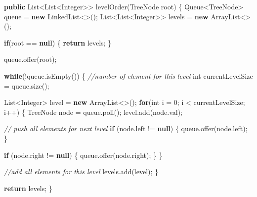 \documentclass[]{book}
\newenvironment{Shaded}{\begin{snugshade}}{\end{snugshade}}
\newcommand{\BuiltInTok}[1]{#1}
\newcommand{\CommentTok}[1]{\textcolor[rgb]{0.56,0.35,0.01}{\textit{#1}}}
\newcommand{\DataTypeTok}[1]{\textcolor[rgb]{0.13,0.29,0.53}{#1}}
\newcommand{\DecValTok}[1]{\textcolor[rgb]{0.00,0.00,0.81}{#1}}
\newcommand{\FunctionTok}[1]{\textcolor[rgb]{0.00,0.00,0.00}{#1}}
\newcommand{\KeywordTok}[1]{\textcolor[rgb]{0.13,0.29,0.53}{\textbf{#1}}}
\newcommand{\NormalTok}[1]{#1}
\begin{document}
\begin{Shaded}
\begin{Highlighting}[]
\KeywordTok{public} \BuiltInTok{List}\NormalTok{<}\BuiltInTok{List}\NormalTok{<}\BuiltInTok{Integer}\NormalTok{>> }\FunctionTok{levelOrder}\NormalTok{(}\BuiltInTok{TreeNode}\NormalTok{ root) \{}
    \BuiltInTok{Queue}\NormalTok{<}\BuiltInTok{TreeNode}\NormalTok{> queue = }\KeywordTok{new} \BuiltInTok{LinkedList}\NormalTok{<>();}
    \BuiltInTok{List}\NormalTok{<}\BuiltInTok{List}\NormalTok{<}\BuiltInTok{Integer}\NormalTok{>> levels = }\KeywordTok{new} \BuiltInTok{ArrayList}\NormalTok{<>();}

    \KeywordTok{if}\NormalTok{(root == }\KeywordTok{null}\NormalTok{) \{}
        \KeywordTok{return}\NormalTok{ levels;}
\NormalTok{    \}}

\NormalTok{    queue.}\FunctionTok{offer}\NormalTok{(root);}

    \KeywordTok{while}\NormalTok{(!queue.}\FunctionTok{isEmpty}\NormalTok{()) \{}
        \CommentTok{//number of element for this level}
        \DataTypeTok{int}\NormalTok{ currentLevelSize = queue.}\FunctionTok{size}\NormalTok{();}

        \BuiltInTok{List}\NormalTok{<}\BuiltInTok{Integer}\NormalTok{> level = }\KeywordTok{new} \BuiltInTok{ArrayList}\NormalTok{<>();}
        \KeywordTok{for}\NormalTok{(}\DataTypeTok{int}\NormalTok{ i = }\DecValTok{0}\NormalTok{; i < currentLevelSize; i++) \{}
            \BuiltInTok{TreeNode}\NormalTok{ node = queue.}\FunctionTok{poll}\NormalTok{();}
\NormalTok{            level.}\FunctionTok{add}\NormalTok{(node.}\FunctionTok{val}\NormalTok{);}

            \CommentTok{// push all elements for next level}
            \KeywordTok{if}\NormalTok{ (node.}\FunctionTok{left}\NormalTok{ != }\KeywordTok{null}\NormalTok{) \{}
\NormalTok{                queue.}\FunctionTok{offer}\NormalTok{(node.}\FunctionTok{left}\NormalTok{);}
\NormalTok{            \}}

            \KeywordTok{if}\NormalTok{ (node.}\FunctionTok{right}\NormalTok{ != }\KeywordTok{null}\NormalTok{) \{}
\NormalTok{                queue.}\FunctionTok{offer}\NormalTok{(node.}\FunctionTok{right}\NormalTok{);}
\NormalTok{            \}}
\NormalTok{        \}}

        \CommentTok{//add all elements for this level}
\NormalTok{        levels.}\FunctionTok{add}\NormalTok{(level);}
\NormalTok{    \}}

    \KeywordTok{return}\NormalTok{ levels;}
\NormalTok{\}}
\end{Highlighting}
\end{Shaded}
\end{document}
